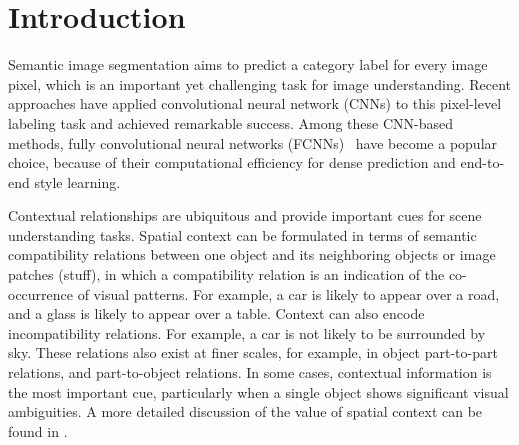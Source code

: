 





\section{Introduction}



Semantic image segmentation aims to predict a category label for every image pixel,
which is an important yet challenging task for image understanding.
Recent approaches have applied convolutional neural network (CNNs) \cite{farabet2013learning,LongSD14,ChenPKMY14}
to this pixel-level labeling task and achieved remarkable success.
Among these CNN-based methods, fully convolutional neural networks (FCNNs)~\cite{LongSD14,ChenPKMY14}
have become a popular choice, because of their computational efficiency for dense prediction and end-to-end style learning.




Contextual relationships are ubiquitous and provide important cues for scene understanding tasks.
Spatial context can be formulated in terms of  semantic compatibility relations between one object and its neighboring objects or image patches (stuff), in which a compatibility relation is an indication of the co-occurrence of visual patterns.
For example, a car is likely to appear over a road, and a glass is likely to appear over a table.
Context can also encode incompatibility relations.
For example, a car is not likely to be surrounded by sky.  These relations also exist
at finer scales, for example, in
object part-to-part relations, and part-to-object relations.
In some cases, contextual information is the most important cue, particularly when a single object shows significant visual ambiguities.
A more detailed discussion of the value of spatial context can be found in \cite{heitz2008learning}.






